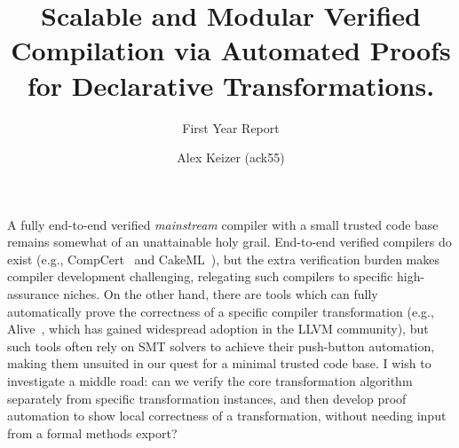 \documentclass[a4paper]{scrartcl}
\begin{document}
\title{Scalable and Modular Verified Compilation via Automated Proofs
for Declarative
Transformations.}                                      
\subtitle{First Year Report}

\author{Alex Keizer \small{(ack55)}}
\date{}



\maketitle

A fully end-to-end verified \emph{mainstream} compiler with a small
trusted code base remains somewhat of an unattainable holy grail.
End-to-end verified compilers do exist (e.g., CompCert~\cite{leroyCompCertFormallyVerified} and CakeML~\cite{kumarCakeMLVerifiedImplementation2014}), but the extra
verification burden makes compiler development challenging, relegating
such compilers to specific high-assurance niches. On the other hand,
there are tools which can fully automatically prove the correctness of a
specific compiler transformation (e.g., Alive~\cite{lopesAlive2BoundedTranslation2021}, which has gained
widespread adoption in the LLVM community), but such tools
often rely on SMT solvers to achieve their push-button automation,
making them unsuited in our quest for a minimal trusted code base. I
wish to investigate a middle road: can we verify the core transformation
algorithm separately from specific transformation instances, and then
develop proof automation to show local
correctness of a transformation, without needing input from a formal methods export?
\end{document}
